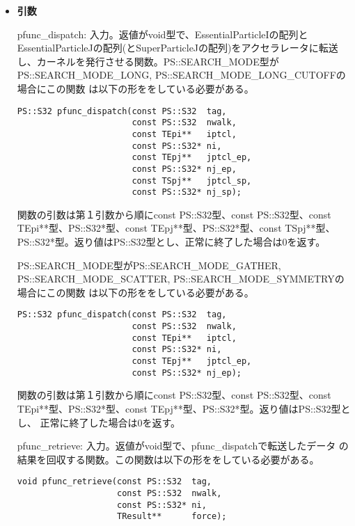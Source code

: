 \begin{itemize}

\item {\bf 引数}

pfunc\_dispatch: 入力。返値がvoid型で、EssentialParticleIの配列と
EssentialParticleJの配列(とSuperParticleJの配列)をアクセラレータに転送
し、カーネルを発行させる関数。PS::SEARCH\_MODE型が
PS::SEARCH\_MODE\_LONG, PS::SEARCH\_MODE\_LONG\_CUTOFFの場合にこの関数
は以下の形ををしている必要がある。

\begin{verbatim}
PS::S32 pfunc_dispatch(const PS::S32  tag,
                       const PS::S32  nwalk,
                       const TEpi**   iptcl,
                       const PS::S32* ni,
                       const TEpj**   jptcl_ep,
                       const PS::S32* nj_ep,
                       const TSpj**   jptcl_sp,
                       const PS::S32* nj_sp);
\end{verbatim}

関数の引数は第１引数から順にconst PS::S32型、const PS::S32型、const
TEpi**型、PS::S32*型、const TEpj**型、PS::S32*型、const TSpj**型、
PS::S32*型。返り値はPS::S32型とし、正常に終了した場合は0を返す。


PS::SEARCH\_MODE型がPS::SEARCH\_MODE\_GATHER,
PS::SEARCH\_MODE\_SCATTER, PS::SEARCH\_MODE\_SYMMETRYの場合にこの関数
は以下の形ををしている必要がある。

\begin{verbatim}
PS::S32 pfunc_dispatch(const PS::S32  tag,
                       const PS::S32  nwalk,
                       const TEpi**   iptcl,
                       const PS::S32* ni,
                       const TEpj**   jptcl_ep,
                       const PS::S32* nj_ep);
\end{verbatim}

関数の引数は第１引数から順にconst PS::S32型、const PS::S32型、const
TEpi**型、PS::S32*型、const TEpj**型、PS::S32*型。返り値はPS::S32型とし、
正常に終了した場合は0を返す。

pfunc\_retrieve: 入力。返値がvoid型で、pfunc\_dispatchで転送したデータ
の結果を回収する関数。この関数は以下の形ををしている必要がある。

\begin{verbatim}
void pfunc_retrieve(const PS::S32  tag,
                    const PS::S32  nwalk,
                    const PS::S32* ni,
                    TResult**      force);
\end{verbatim}


\end{itemize}
